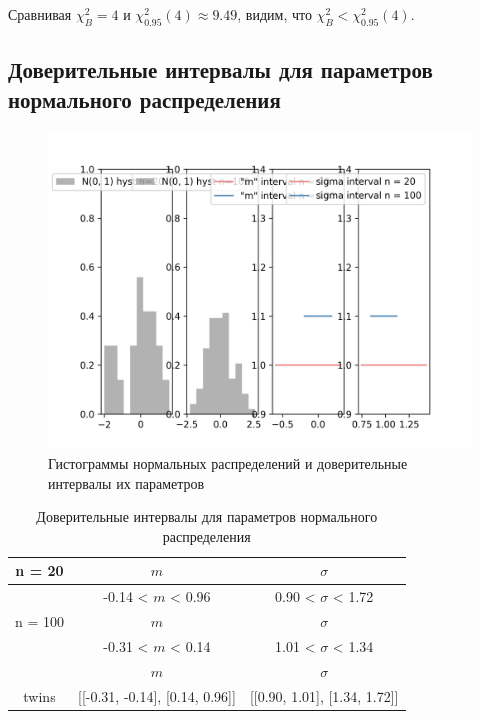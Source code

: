\documentclass[main.tex]{subfiles}
\begin{document}
\noindent Сравнивая $\chi^{2}_{B} = 4$ и $\chi^{2}_{0.95}(4) \approx 9.49$, видим, что $\chi^{2}_{B} < \chi^{2}_{0.95}(4)$.

\FloatBarrier
\subsection{Доверительные интервалы для параметров нормального распределения}
\begin{figure}[ht]
	\centering
	\includegraphics[width=\textwidth]{../images/interval/8_1.png}
	\caption{Гистограммы нормальных распределений и доверительные интервалы их параметров}
	\label{w_pert1}
\end{figure}

\begin{table}[ht]
	\centering
	\begin{tabular}{| c | c | c |}
		\hline
		n = 20   &  $m$  & $\sigma$\\ \hline
		&  -0.14 < $m$ < 0.96 & 0.90 < $\sigma$ < 1.72 \\ \hline
		n = 100   &  $m$  & $\sigma$\\ \hline
		& -0.31 < $m$ < 0.14 & 1.01 < $\sigma$ < 1.34 \\ \hline
		& $m$ & $\sigma$\\ \hline
		twins & [[-0.31, -0.14], [0.14, 0.96]] & [[0.90, 1.01], [1.34, 1.72]] \\
		\hline
	\end{tabular}
	\caption{Доверительные интервалы для параметров нормального распределения}
	\label{tab:interv_simple}
\end{table}
\end{document}
